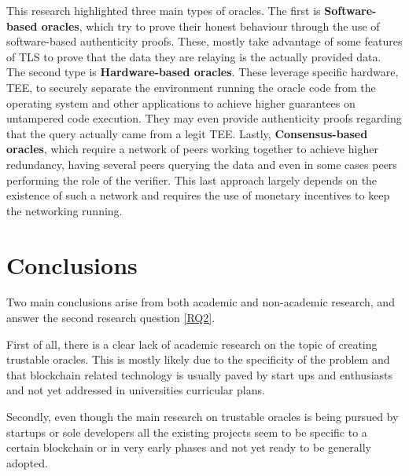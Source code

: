 \documentclass[final,3p,12pt,twocolumn]{elsarticle}
\begin{document}
This research highlighted three main types of oracles. The first is \textbf{Software-based oracles}, which try to prove their honest behaviour through the use of software-based authenticity proofs. These, mostly take advantage of some features of TLS to prove that the data they are relaying is the actually provided data. The second type is \textbf{Hardware-based oracles}. These leverage specific hardware, TEE, to securely separate the environment running the oracle code from the operating system and other applications to achieve higher guarantees on untampered code execution. They may even provide authenticity proofs regarding that the query actually came from a legit TEE. Lastly, \textbf{Consensus-based oracles}, which require a network of peers working together to achieve higher redundancy, having several peers querying the data and even in some cases peers performing the role of the verifier. This last approach largely depends on the existence of such a network and requires the use of monetary incentives to keep the networking running.


\section{Conclusions}

Two main conclusions arise from both academic and non-academic research, and answer the second research question \ref{RQ2}.

First of all, there is a clear lack of academic research on the topic of creating trustable oracles. This is mostly likely due to the specificity of the problem and that blockchain related technology is usually paved by start ups and enthusiasts and not yet addressed in universities curricular plans.

Secondly, even though the main research on trustable oracles is being pursued by startups or sole developers all the existing projects seem to be specific to a certain blockchain or in very early phases and not yet ready to be generally adopted.


\nolinenumbers


\end{document}
